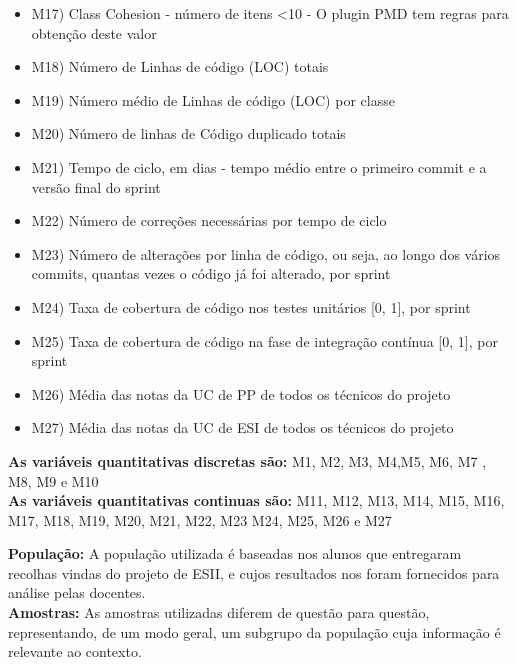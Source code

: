 \documentclass[%
 aip,
cp,  %
 amsmath,amssymb,%
 reprint,%
]{revtex4-2}
\begin{document}
\begin{itemize}
    \item M17) Class Cohesion - número de itens <10 - O plugin PMD tem regras para obtenção deste valor
    \item M18) Número de Linhas de código (LOC) totais 
    \item M19) Número médio de Linhas de código (LOC) por classe
    \item M20) Número de linhas de Código duplicado totais 
    \item M21) Tempo de ciclo, em dias - tempo médio entre o primeiro commit e a versão final do sprint
    \item M22) Número de correções necessárias por tempo de ciclo
    \item M23) Número de alterações por linha de código, ou seja, ao longo dos vários commits, quantas vezes o código já foi alterado, por sprint
    \item M24) Taxa de cobertura de código nos testes unitários [0, 1], por sprint
    \item M25) Taxa de cobertura de código na fase de integração contínua [0, 1], por sprint
    \item M26) Média das notas da UC de PP de todos os técnicos do projeto
    \item M27) Média das notas da UC de ESI de todos os técnicos do projeto
\end{itemize}

\vspace{0.5cm}

\textbf{ As variáveis quantitativas discretas são: }
 M1, M2, M3, M4,M5, M6, M7 , M8, M9 e M10 \\

 
\textbf{ As variáveis quantitativas continuas são: }
M11, M12, M13, M14, M15, M16, M17, M18, M19, M20, M21, M22, M23 M24, M25, M26 e M27\\

\vspace{2cm}

\textbf{ População:  }
A população utilizada é baseadas nos alunos que entregaram recolhas vindas do projeto de ESII, e cujos resultados nos foram fornecidos para análise pelas docentes.\\



\textbf{ Amostras:  }
As amostras utilizadas diferem de questão para questão, representando, de um modo geral, um subgrupo da população cuja informação é relevante ao contexto.\\
\end{document}
